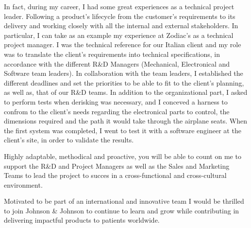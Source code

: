 \documentclass[11pt, a4paper]{awesome-cv}
\begin{document}
\begin{cvletter}
In fact, during my career, I had some great experiences as a technical project leader. 
Following a product's lifecycle from the customer's requirements to its delivery and working closely with all the internal and external stakeholders.
In particular, I can take as an example my experience at Zodiac's as a technical project manager. 
I was the technical reference for our Italian client and my role was to translate the client's requirements into technical specifications, in accordance with the different R\&D Managers (Mechanical, Electronical and Software team leaders).
In collaboration with the team leaders, I established the different deadlines and set the priorities to be able to fit to the client's planning, as well as, that of our R\&D teams.
In addition to the organizational part, I asked to perform tests when derisking was necessary, and I conceved a harness to confrom to the client's needs regarding the electronical parts to control, the dimensions required and the path it would take through the airplane seats.
When the first system was completed, I went to test it with a software engineer at the client's site, in order to validate the results.

Highly adaptable, methodical and proactive, you will be able to count on me to support the R\&D and Project Managers as well as the Sales and Marketing Teams
to lead the project to succes in a cross-functional and cross-cultural environment.

Motivated to be part of an international and innovative team I would be thrilled to join Johnson \& Johnson to continue to learn and grow while contributing in delivering impactful products to patients worldwide.

\end{cvletter}

\makeletterclosing
\end{document}
